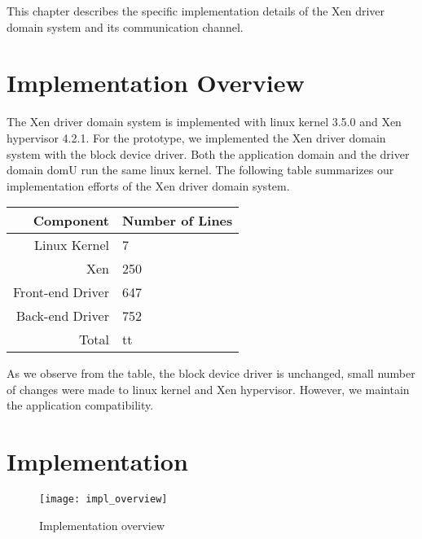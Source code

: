 This chapter describes the specific implementation details of the Xen driver domain system and its communication channel.

\section{Implementation Overview} 
The Xen driver domain system is implemented with linux kernel 3.5.0 and Xen hypervisor 4.2.1. For the prototype, we implemented the Xen driver domain system with the block device driver. Both the application domain and the driver domain domU run the same linux kernel. The following table summarizes our implementation efforts of the Xen driver domain system. 

\begin{center}
\begin{tabular}{|r|l|} 
  \hline
  Component & Number of Lines \\
  \hline
  Linux Kernel & 7 \\
  Xen & 250 \\
  Front-end Driver & 647 \\
  Back-end Driver & 752 \\
  \hline 
  Total & tt\\
  \hline
\end{tabular}
\end{center}

As we observe from the table, the block device driver is unchanged, small number of changes were made to linux kernel and Xen hypervisor. However, we maintain the application compatibility.  
\pagebreak

\section{Implementation}

\begin{figure}[!ht]
\centering
\texttt{[image: impl\_overview]}
\caption{Implementation overview}
\label{fig:Implementation overview}
\end{figure}

